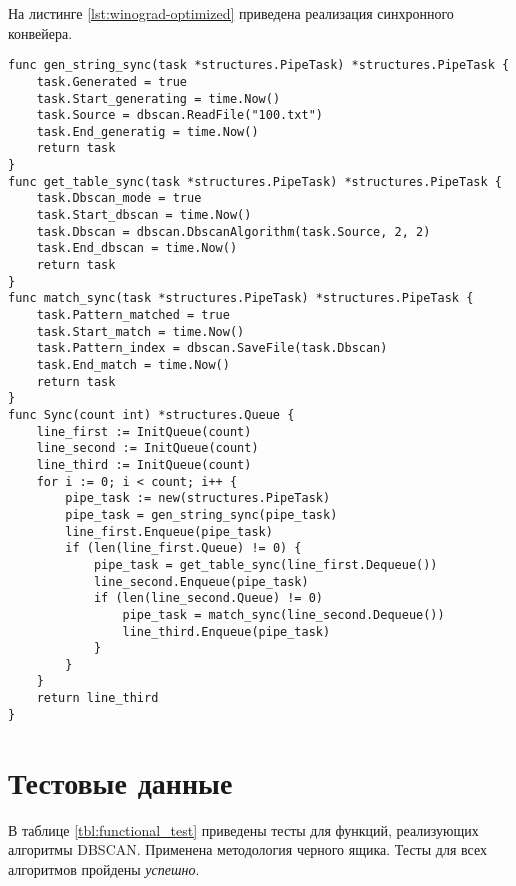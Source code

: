 \newpage
На листинге \ref{lst:winograd-optimized} приведена реализация синхронного конвейера.
\begin{lstlisting}[label=lst:winograd-optimized,caption=Реализация функции параллелизации матрицы точек]
func gen_string_sync(task *structures.PipeTask) *structures.PipeTask {
	task.Generated = true
	task.Start_generating = time.Now()
	task.Source = dbscan.ReadFile("100.txt")
	task.End_generatig = time.Now()
	return task
}
func get_table_sync(task *structures.PipeTask) *structures.PipeTask {
	task.Dbscan_mode = true
	task.Start_dbscan = time.Now()
	task.Dbscan = dbscan.DbscanAlgorithm(task.Source, 2, 2)
	task.End_dbscan = time.Now()
	return task
}
func match_sync(task *structures.PipeTask) *structures.PipeTask {
	task.Pattern_matched = true
	task.Start_match = time.Now()
	task.Pattern_index = dbscan.SaveFile(task.Dbscan)
	task.End_match = time.Now()
	return task
}
func Sync(count int) *structures.Queue {
	line_first := InitQueue(count)
	line_second := InitQueue(count)
	line_third := InitQueue(count)
	for i := 0; i < count; i++ {
		pipe_task := new(structures.PipeTask)
		pipe_task = gen_string_sync(pipe_task)
		line_first.Enqueue(pipe_task)
		if (len(line_first.Queue) != 0) {
			pipe_task = get_table_sync(line_first.Dequeue())
			line_second.Enqueue(pipe_task)
			if (len(line_second.Queue) != 0) 
				pipe_task = match_sync(line_second.Dequeue())
				line_third.Enqueue(pipe_task)
			}
		}
	}
	return line_third
}
\end{lstlisting}	

\section{Тестовые данные}

В таблице \ref{tbl:functional_test} приведены тесты для функций, реализующих алгоритмы DBSCAN. Применена методология черного ящика. Тесты для всех алгоритмов пройдены \textit{успешно}.


